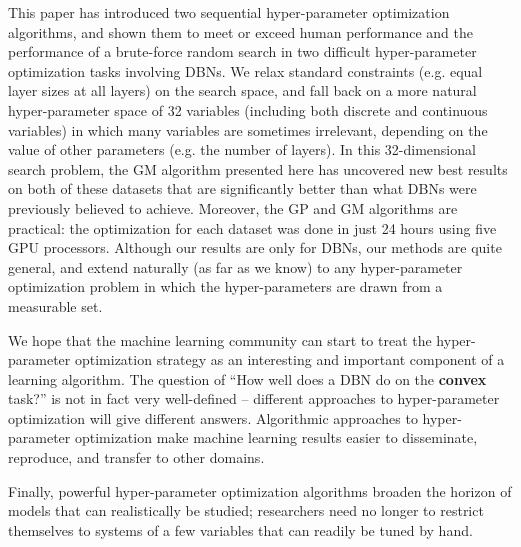 \documentclass{article}
\begin{document}
This paper has introduced two sequential hyper-parameter optimization algorithms,
and shown them to meet or exceed human performance and the performance of a brute-force random search
in two difficult hyper-parameter optimization tasks involving DBNs.
We relax standard constraints (e.g. equal layer sizes at all layers) on the search space,
and fall back on a more natural hyper-parameter space of 32 variables
(including both discrete and continuous variables)
in which many variables are sometimes irrelevant,
depending on the value of other parameters (e.g. the number of layers).
In this 32-dimensional search problem,
the GM algorithm presented here has uncovered new best results on both of these datasets that are significantly better than what DBNs were previously believed to achieve.
Moreover, the GP and GM algorithms are practical: the optimization for each dataset was done in just 24 hours using five GPU processors.
Although our results are only for DBNs, our methods are quite general, and extend naturally (as far as we know) to any hyper-parameter optimization problem in which the hyper-parameters are drawn from a measurable set.

We hope that the machine learning community can start to treat the
hyper-parameter optimization strategy as an interesting and important component of a learning algorithm.
The question of ``How well does a DBN do on the {\bf convex} task?'' is not in fact very well-defined --
different approaches to hyper-parameter optimization will give different answers.
Algorithmic approaches to hyper-parameter optimization make machine learning results easier to disseminate, reproduce, and transfer to other domains.

Finally, powerful hyper-parameter optimization algorithms broaden the horizon of models that can realistically be studied; researchers need no longer to restrict themselves to systems of a few variables that can readily be tuned by hand.


%



\newpage
\small


\end{document}
